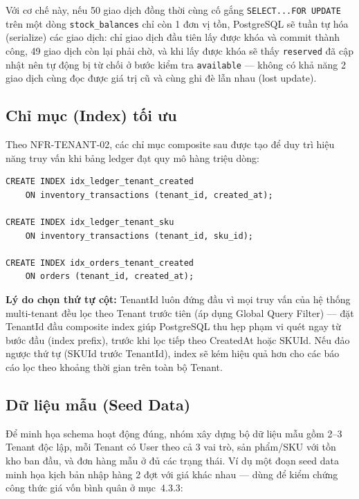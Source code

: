 Với cơ chế này, nếu 50 giao dịch đồng thời cùng cố gắng \texttt{SELECT...FOR UPDATE} trên một dòng \texttt{stock\_balances} chỉ còn 1 đơn vị tồn, PostgreSQL sẽ tuần tự hóa (serialize) các giao dịch: chỉ giao dịch đầu tiên lấy được khóa và commit thành công, 49 giao dịch còn lại phải chờ, và khi lấy được khóa sẽ thấy \texttt{reserved} đã cập nhật nên tự động bị từ chối ở bước kiểm tra \texttt{available} — không có khả năng 2 giao dịch cùng đọc được giá trị cũ và cùng ghi đè lẫn nhau (lost update).

\subsection{Chỉ mục (Index) tối ưu}
Theo NFR-TENANT-02, các chỉ mục composite sau được tạo để duy trì hiệu năng truy vấn khi bảng ledger đạt quy mô hàng triệu dòng:

\begin{lstlisting}
CREATE INDEX idx_ledger_tenant_created
    ON inventory_transactions (tenant_id, created_at);

CREATE INDEX idx_ledger_tenant_sku
    ON inventory_transactions (tenant_id, sku_id);

CREATE INDEX idx_orders_tenant_created
    ON orders (tenant_id, created_at);
\end{lstlisting}

\textbf{Lý do chọn thứ tự cột:} TenantId luôn đứng đầu vì mọi truy vấn của hệ thống multi-tenant đều lọc theo Tenant trước tiên (áp dụng Global Query Filter) — đặt TenantId đầu composite index giúp PostgreSQL thu hẹp phạm vi quét ngay từ bước đầu (index prefix), trước khi lọc tiếp theo CreatedAt hoặc SKUId. Nếu đảo ngược thứ tự (SKUId trước TenantId), index sẽ kém hiệu quả hơn cho các báo cáo lọc theo khoảng thời gian trên toàn bộ Tenant.

\subsection{Dữ liệu mẫu (Seed Data)}
Để minh họa schema hoạt động đúng, nhóm xây dựng bộ dữ liệu mẫu gồm 2--3 Tenant độc lập, mỗi Tenant có User theo cả 3 vai trò, sản phẩm/SKU với tồn kho ban đầu, và đơn hàng mẫu ở đủ các trạng thái. Ví dụ một đoạn seed data minh họa kịch bản nhập hàng 2 đợt với giá khác nhau — dùng để kiểm chứng công thức giá vốn bình quân ở mục~4.3.3:


